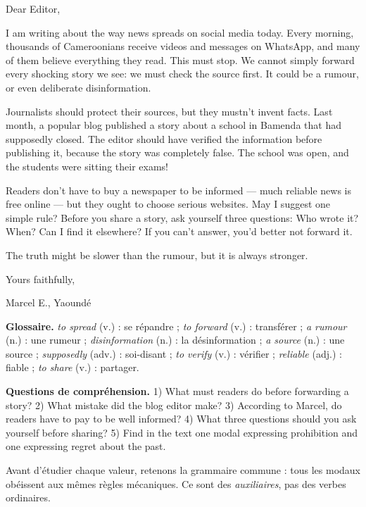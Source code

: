 \documentclass[11pt]{article}
\newcounter{popsec}
\newcounter{popsub}
\newcommand{\courssub}[1]{%
  \stepcounter{popsub}%
  \par\vspace{9pt}\noindent{\popxbold\fontsize{11.5}{13}\selectfont\color{popink}{\color{poporange}\thepopsec.\thepopsub}\hspace{6pt}#1}\par\nopagebreak\vspace{4pt}
}
\begin{document}
\begin{textebox}
Dear Editor,

I am writing about the way news spreads on social media today. Every morning, thousands of Cameroonians receive videos and messages on WhatsApp, and many of them believe everything they read. This must stop. We cannot simply forward every shocking story we see: we must check the source first. It could be a rumour, or even deliberate disinformation.

Journalists should protect their sources, but they mustn't invent facts. Last month, a popular blog published a story about a school in Bamenda that had supposedly closed. The editor should have verified the information before publishing it, because the story was completely false. The school was open, and the students were sitting their exams!

Readers don't have to buy a newspaper to be informed — much reliable news is free online — but they ought to choose serious websites. May I suggest one simple rule? Before you share a story, ask yourself three questions: Who wrote it? When? Can I find it elsewhere? If you can't answer, you'd better not forward it.

The truth might be slower than the rumour, but it is always stronger.

Yours faithfully,

Marcel E., Yaoundé
\end{textebox}

\textbf{Glossaire.} \emph{to spread} (v.) : se répandre ; \emph{to forward} (v.) : transférer ; \emph{a rumour} (n.) : une rumeur ; \emph{disinformation} (n.) : la désinformation ; \emph{a source} (n.) : une source ; \emph{supposedly} (adv.) : soi-disant ; \emph{to verify} (v.) : vérifier ; \emph{reliable} (adj.) : fiable ; \emph{to share} (v.) : partager.

\textbf{Questions de compréhension.} 1) What must readers do before forwarding a story? 2) What mistake did the blog editor make? 3) According to Marcel, do readers have to pay to be well informed? 4) What three questions should you ask yourself before sharing? 5) Find in the text one modal expressing prohibition and one expressing regret about the past.

\courssub{La structure commune à tous les modaux}

Avant d'étudier chaque valeur, retenons la grammaire commune : tous les modaux obéissent aux mêmes règles mécaniques. Ce sont des \emph{auxiliaires}, pas des verbes ordinaires.
\end{document}
